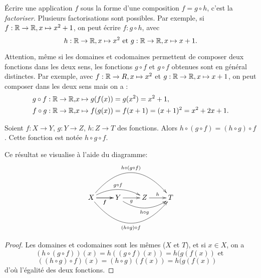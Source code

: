 \begin{definition}
\'Ecrire une application $f$ sous la forme d'une composition $f = g\circ h$, c'est la \emph{factoriser}. Plusieurs factorisations sont possibles. Par exemple, si $f : \mathbb{R}\to \mathbb{R}, x\mapsto x^2+1$, on peut écrire $f : g\circ h$, avec
\[
h : \mathbb{R}\to \mathbb{R}, x\mapsto x^2 
\text{ et }
g : \mathbb{R}\to \mathbb{R}, x\mapsto x+1.
\]
\end{definition}

\noindent{}


\begin{attention}
Attention, même si les domaines et codomaines permettent de composer deux fonctions dans les deux sens, les fonctions $g\circ f$ et $g\circ f$ obtenues sont en général distinctes. Par exemple, avec $f : \mathbb{R}\to R, x\mapsto x^2
$ et $g : \mathbb{R}\to \mathbb{R}, x\mapsto x+1$,  on peut composer dans les deux sens mais on a :
\begin{align*}
g\circ f : \mathbb{R}\to \mathbb{R}, & x\mapsto g(f(x)) = g(x^2) = x^2+1,\\
f\circ g : \mathbb{R}\to \mathbb{R}, & x\mapsto f(g(x)) = f(x+1) = (x+1)^2 = x^2+2x+1.
\end{align*}
\end{attention}


\begin{proposition}
Soient $f : X\to Y$, $g : Y\to Z$, $h  : Z\to T$ des fonctions. Alors $h\circ (g\circ f) = (h\circ g)\circ f$. Cette fonction est notée $h\circ g\circ f$.

Ce résultat se visualise à l'aide du diagramme:
\[
\xymatrix{
X \ar[r]_{f} \ar@/^1pc/[rr]^{g\circ f} \ar[r]_{f} \ar@/^3pc/[rrr]^{h\circ (g\circ f)} \ar@/_3pc/[rrr]_{(h\circ g) \circ f}& Y \ar[r]_{g} \ar@/_1.2pc/[rr]_{h\circ g} & Z \ar[r]^{h} & T
}
\]

\end{proposition}
\begin{proof}
Les domaines et codomaines sont les mêmes ($X$ et $T$), et si $x\in X$, on a 
\[ \left(h\circ (g\circ f)\right) (x) = h((g\circ f)(x)) = h(g(f(x)) \text{ et } \]
\[ \left( (h\circ g)\circ f \right) (x) = (h \circ g)(f(x)) = h(g(f(x))\quad \]
d'où l'égalité des deux fonctions.
\end{proof}


